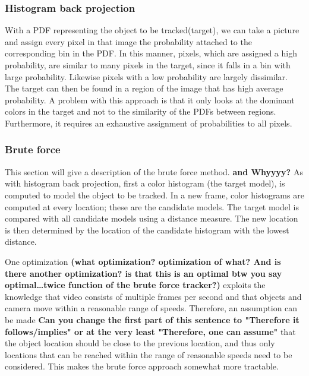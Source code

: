 \documentclass[a4paper,11pt]{article}
\begin{document}
\subsubsection{Histogram back projection}

With a PDF representing the object to be tracked(target), we can take a picture and assign every pixel in that image the probability attached to the corresponding bin in the PDF. In this manner, pixels, which are assigned a high probability, are similar to many pixels in the target, since it falls in a bin with large probability. Likewise pixels with a low probability are largely dissimilar. The target can then be found in a region of the image that has high average probability. A problem with this approach is that it only looks at the dominant colors in the target and not to the similarity of the PDFs between regions. Furthermore, it requires an exhaustive assignment of probabilities to all pixels.


\subsubsection{Brute force}
This section will give a description of the brute force method. \textbf{and Whyyyy?} As with histogram back projection, first a color histogram (the target model), is computed to model the object to be tracked. In a new frame, color histograms are computed at every location; these are the candidate models. The target model is compared with all candidate models using a distance measure. The new location is then determined by the location of the candidate histogram with the lowest distance.

One optimization \textbf{(what optimization? optimization of what? And is there another optimization? is that this is an optimal \textbf{btw you say optimal\ldots twice} function of the brute force tracker?)} exploits the knowledge that video consists of multiple frames per second and that objects and camera move within a reasonable range of speeds. Therefore, an assumption can be made \textbf{Can you change the first part of this sentence to "Therefore it follows/implies" or at the very least "Therefore, one can assume"} that the object location should be close to the previous location, and thus only locations that can be reached within the range of reasonable speeds need to be considered. This makes the brute force approach somewhat more tractable. 
\end{document}
